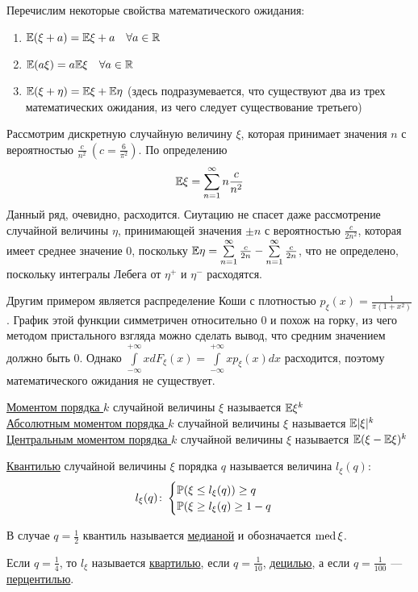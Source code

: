 Перечислим некоторые свойства математического ожидания:
\begin{enumerate}
	\item $\mathbb{E}(\xi + a) = \mathbb{E}\xi + a \quad \forall a \in \mathbb{R}$
	\item $\mathbb{E}(a\xi) = a\mathbb{E}\xi \quad \forall a \in \mathbb{R}$
	\item $\mathbb{E}(\xi + \eta) = \mathbb{E}\xi + \mathbb{E}\eta$ (здесь подразумевается, что существуют два из трех математических ожидания, из чего следует существование третьего)
\end{enumerate}
\begin{Ex}
Рассмотрим дискретную случайную величину $\xi$, которая принимает значения $n$ с вероятностью $\frac{c}{n^2} \ (c = \frac{6}{\pi^2})$. По определению
$$ \mathbb{E}\xi = \sum\limits_{n=1}^{\infty} n \frac{c}{n^2} $$
Данный ряд, очевидно, расходится. Сиутацию не спасет даже рассмотрение случайной величины $\eta$, принимающей значения $\pm n$ с вероятностью $\frac{c}{2n^2}$, 
которая имеет среднее значение 0, 
поскольку $\mathbb{E}\eta = \sum\limits_{n=1}^{\infty} \frac{c}{2n} - \sum\limits_{n=1}^{\infty} \frac{c}{2n}$, что не определено, поскольку интегралы Лебега от $\eta^+$ и $\eta^-$ расходятся.\\
\end{Ex}
\begin{Ex}
Другим примером является распределение Коши с плотностью $p_\xi(x) = \frac{1}{\pi(1+x^2)}$. График этой функции симметричен относительно 0 и похож на горку, из чего
методом пристального взгляда можно сделать вывод, что средним значением должно быть 0. Однако  $
\int\limits_{-\infty}^{+\infty} x dF_\xi(x) =  \int\limits_{-\infty}^{+\infty} x p_\xi(x)dx$ расходится, поэтому математического ожидания не существует.
\end{Ex}

\begin{Def}
\underline{Моментом порядка $k$} случайной величины $\xi$ называется $\mathbb{E}\xi^k$ \\
\underline{Абсолютным моментом порядка $k$} случайной величины $\xi$ называется $\mathbb{E}|\xi|^k$ \\
\underline{Центральным моментом порядка $k$} случайной величины $\xi$ называется $\mathbb{E}(\xi - \mathbb{E}\xi)^k$ \\
\end{Def}

\begin{Def}
\underline{Квантилью} случайной величины $\xi$ порядка $q$ называется величина $l_\xi(q)$:
\[
   	l_\xi(q) \colon 
  	\begin{cases}
  		\mathbb{P}(\xi \le l_\xi(q)) \ge q \\
  		\mathbb{P}(\xi \ge l_\xi(q) \ge 1-q
  	\end{cases}
  \]
  
  В случае $q=\frac12$ квантиль называется \underline{медианой} и обозначается ${\rm med \,}\xi$.
  
  Если $q=\frac14$, то $l_\xi$ называется \underline{квартилью}, если $q=\frac1{10}$, \underline{децилью}, а если $q=\frac{1}{100}$ --- \underline{перцентилью}.
\end{Def}

